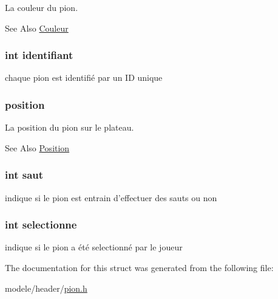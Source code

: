 La couleur du pion. 

\begin{DoxySeeAlso}{See Also}
\hyperlink{couleur_8h_a297c7f13df924dd6c731cb40f9fff63c}{Couleur} 
\end{DoxySeeAlso}
\hypertarget{struct_pion_a05af294add88c6f08e066bf37a7a7a4d}{
\subsubsection[{identifiant}]{\setlength{\rightskip}{0pt plus 5cm}int identifiant}}\label{struct_pion_a05af294add88c6f08e066bf37a7a7a4d}


chaque pion est identifié par un I\-D unique 

\hypertarget{struct_pion_a4d84949a19a29d3bb4dd2635c8241a83}{
\subsubsection[{position}]{ position}}\label{struct_pion_a4d84949a19a29d3bb4dd2635c8241a83}


La position du pion sur le plateau. 

\begin{DoxySeeAlso}{See Also}
\hyperlink{struct_position}{Position} 
\end{DoxySeeAlso}
\hypertarget{struct_pion_acc7ca3a448047471c3336a429748dc3f}{
\subsubsection[{saut}]{\setlength{\rightskip}{0pt plus 5cm}int saut}}\label{struct_pion_acc7ca3a448047471c3336a429748dc3f}


indique si le pion est entrain d'effectuer des sauts ou non 

\hypertarget{struct_pion_a1121d56f47a88b92bb5510a6ecf36aab}{
\subsubsection[{selectionne}]{\setlength{\rightskip}{0pt plus 5cm}int selectionne}}\label{struct_pion_a1121d56f47a88b92bb5510a6ecf36aab}


indique si le pion a été selectionné par le joueur 



The documentation for this struct was generated from the following file\-:\begin{DoxyCompactItemize}
\item 
modele/header/\hyperlink{pion_8h}{pion.\-h}\end{DoxyCompactItemize}
